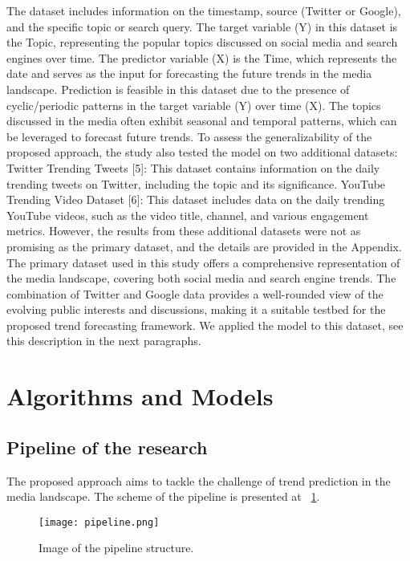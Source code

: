 The dataset includes information on the timestamp, source (Twitter or Google), and the specific topic or search query.
The target variable (Y) in this dataset is the Topic, representing the popular topics discussed on social media and search engines over time. The predictor variable (X) is the Time, which represents the date and serves as the input for forecasting the future trends in the media landscape.
Prediction is feasible in this dataset due to the presence of cyclic/periodic patterns in the target variable (Y) over time (X). The topics discussed in the media often exhibit seasonal and temporal patterns, which can be leveraged to forecast future trends.
To assess the generalizability of the proposed approach, the study also tested the model on two additional datasets:
Twitter Trending Tweets [5]: This dataset contains information on the daily trending tweets on Twitter, including the topic and its significance.
YouTube Trending Video Dataset [6]: This dataset includes data on the daily trending YouTube videos, such as the video title, channel, and various engagement metrics.
However, the results from these additional datasets were not as promising as the primary dataset, and the details are provided in the Appendix.
The primary dataset used in this study offers a comprehensive representation of the media landscape, covering both social media and search engine trends. The combination of Twitter and Google data provides a well-rounded view of the evolving public interests and discussions, making it a suitable testbed for the proposed trend forecasting framework.
We applied the model to this dataset, see this description in the next paragraphs.


\section{Algorithms and Models}

\subsection{Pipeline of the research}

The proposed approach aims to tackle the challenge of trend prediction in the media landscape. The scheme of the pipeline is presented at ~\ref{fig:pipeline}.

\begin{figure}[h] 
    \centering
    \texttt{[image: pipeline.png]}
    \label{fig:pipeline}
    \caption{Image of the pipeline structure.}
\end{figure}

